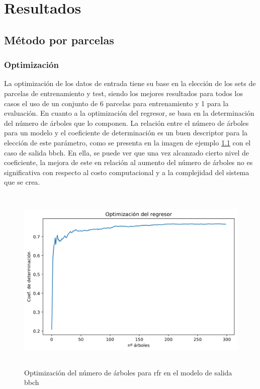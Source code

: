 
\chapter{Resultados}
\label{resultados}
\section{Método por parcelas}
\subsection{Optimización}
\par La optimización de los datos de entrada tiene su base en la elección de los sets de parcelas de entrenamiento y test, siendo los mejores resultados para todos los casos el uso de un conjunto de 6 parcelas para entrenamiento y 1 para la evaluación. En cuanto a la optimización del regresor, se basa en la determinación del número de árboles que lo componen. La relación entre el número de árboles para un modelo y el coeficiente de determinación es un buen descriptor para la elección de este parámetro, como se presenta en la imagen de ejemplo \ref{fig:opt_parcl} con el caso de salida \gls{bbch}. En ella, se puede ver que una vez alcanzado cierto nivel de coeficiente, la mejora de este en relación al aumento del número de árboles no es significativa con respecto al costo computacional y a la complejidad del sistema que se crea. 
\begin{figure}[h]
    \centering
    \includegraphics[height=9cm]{archivos/tfg/opt_tree_bbch_mean} 
    \caption{Optimización del número de árboles para \gls{rfr} en el modelo de salida \gls{bbch}\label{fig:opt_parcl}}
    
\end{figure}

